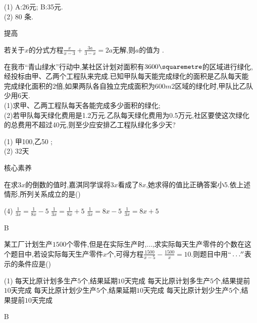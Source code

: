 \documentclass[cn,blue,12pt]{elegantbook}
\renewcommand \tkt[1]{{\CJKunderline[hidden=true, skip=true, thickness=1pt]{#1}}}
\begin{document}
\begin{shiti}
\begin{shiti}
\begin{solution}
            (1) A:26元; B:35元.\\
            (2) 80 条.
\end{solution}
    \end{shiti}
\item 提高
    \begin{shiti}[resume]
    \item 若关于\(x\)的分式方程\(\frac{x}{x-3}+\frac{3a}{3-x}=2a\)无解,则\(a\)的值为\tkt{\(1\text{或}\frac{1}{2}\)} .
    \item 在我市``青山绿水''行动中,某社区计划对面积有\(3600 \squaremetre \)的区域进行绿化,经投标由甲、乙两个工程队来完成.已知甲队每天能完成绿化的面积是乙队每天能完成绿化面积的\(2\)倍,如果两队各自独立完成面积为\(600 m2\)区域的绿化时,甲队比乙队少用\(6\)天.\\
        (1)求甲、乙两工程队每天各能完成多少面积的绿化;\\
        (2)若甲队每天绿化费用是1.2万元.乙队每天绿化费用为0.5万元,社区要使这次绿化的总费用不超过40元,则至少应安排乙工程队绿化多少天?
\begin{solution}
            (1) 甲100,乙50 ;\\
            (2) 32天
\end{solution}
    \end{shiti}
\item 核心素养
    \begin{shiti}
    \item 在求\(3x\)的倒数的值时,嘉淇同学误将\(3x\)看成了\(8x\),她求得的值比正确答案小5.依上述情形,所列关系成立的是(\qquad)\\
    \begin{tasks}(4)
    \task \(\frac{1}{3x}=\frac{1}{8x}-5\)
    \task \(\frac{1}{3x}=\frac{1}{8x}+5\)
    \task \(\frac{1}{3x}=8x-5\)
    \task \(\frac{1}{3x}=8x+5\)
    \end{tasks}
\begin{solution}
        B
\end{solution}
    \item 某工厂计划生产\(1500\)个零件,但是在实际生产时,\(  \dots \),求实际每天生产零件的个数在这个题目中,若设实际每天生产零件\(x\)个,可得方程\(\frac{1500}{x-5}-\frac{1500}{x}=10\).则题目中用\(`` \dots '' \)表示的条件应是(\qquad)\\
    \begin{tasks}(1)
        \task 每天比原计划多生产\(5\)个,结果延期\(10\)天完成
        \task 每天比原计划多生产\(5\)个,结果提前\(10\)天完成
        \task 每天比原计划少生产\(5\)个,结果延期\(10\)天完成
        \task 每天比原计划少生产\(5\)个,结果提前\(10\)天完成
    \end{tasks}
\begin{solution}
        B
\end{solution}
    \end{shiti}
\end{shiti}
\end{document}
